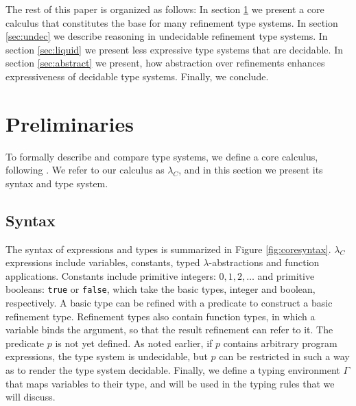The rest of this paper is organized as follows:
In section \ref{subsec:formal} we present a core calculus
that constitutes the base for many refinement type systems.
In section \ref{sec:undec}
we describe reasoning in undecidable refinement type systems.
In section \ref{sec:liquid}
we present less expressive type systems
that are decidable.
In section \ref{sec:abstract} 
we present, how abstraction over refinements
enhances expressiveness of decidable type systems. 
Finally, we conclude.

\section{Preliminaries}\label{subsec:formal}

To formally describe and compare type systems, 
we define a core calculus, following \cite{flanagan06, LiquidPLDI08, Greenberg12}.
We refer to our calculus as $\lambda_C$, 
and in this section we present its syntax and type system.

\subsection{Syntax}
The syntax of expressions and types is summarized in Figure \ref{fig:coresyntax}.
$\lambda_C$ expressions include variables, constants,
typed $\lambda$-abstractions
and function applications. 
%
Constants include primitive integers:
$0, 1, 2, \dots$ and primitive booleans: \texttt{true} or \texttt{false},
which take the basic types, integer and boolean, respectively.
%
A basic type can be refined with a predicate to construct a basic
refinement type.
Refinement types also contain function types, 
in which 
a variable binds the argument,
so that the result refinement can refer to it.  
%
The predicate $p$ is
not yet defined. 
As noted earlier, if $p$ contains arbitrary program 
expressions, the type system is undecidable, but 
$p$ can be restricted in such a way as to render 
the type system decidable.
%
Finally, we define a typing environment $\Gamma$ that maps variables to their type,
and will be used in the typing rules that we will discuss.


